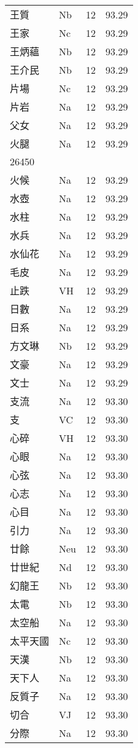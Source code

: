 \documentclass[twocolumn]{book}
\begin{document}
\begin{supertabular}{llrr}
王質 & Nb & 12 &  93.29\\
王家 & Nc & 12 &  93.29\\
王炳蘊 & Nb & 12 &  93.29\\
王介民 & Nb & 12 &  93.29\\
片場 & Nc & 12 &  93.29\\
片岩 & Na & 12 &  93.29\\
父女 & Na & 12 &  93.29\\
火腿 & Na & 12 &  93.29\\
26450\\
火候 & Na & 12 &  93.29\\
水壺 & Na & 12 &  93.29\\
水柱 & Na & 12 &  93.29\\
水兵 & Na & 12 &  93.29\\
水仙花 & Na & 12 &  93.29\\
毛皮 & Na & 12 &  93.29\\
止跌 & VH & 12 &  93.29\\
日數 & Na & 12 &  93.29\\
日系 & Na & 12 &  93.29\\
方文琳 & Nb & 12 &  93.29\\
文豪 & Na & 12 &  93.29\\
文士 & Na & 12 &  93.29\\
支流 & Na & 12 &  93.30\\
支 & VC & 12 &  93.30\\
心碎 & VH & 12 &  93.30\\
心眼 & Na & 12 &  93.30\\
心弦 & Na & 12 &  93.30\\
心志 & Na & 12 &  93.30\\
心目 & Na & 12 &  93.30\\
引力 & Na & 12 &  93.30\\
廿餘 & Neu & 12 &  93.30\\
廿世紀 & Nd & 12 &  93.30\\
幻龍王 & Nb & 12 &  93.30\\
太電 & Nb & 12 &  93.30\\
太空船 & Na & 12 &  93.30\\
太平天國 & Nc & 12 &  93.30\\
天漢 & Nb & 12 &  93.30\\
天下人 & Na & 12 &  93.30\\
反質子 & Na & 12 &  93.30\\
切合 & VJ & 12 &  93.30\\
分際 & Na & 12 &  93.30\\

\end{supertabular}
\end{document}
